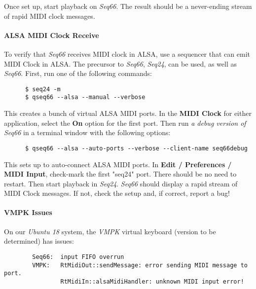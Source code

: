    Once set up, start playback on \textsl{Seq66}.
   The result should be a never-ending stream of rapid MIDI clock messages.

\paragraph{ALSA MIDI Clock Receive}
\label{paragraph:alsa_testing_midi_clock_receive}

   To verify that \textsl{Seq66} receives MIDI clock in ALSA, use a sequencer
   that can emit MIDI Clock in ALSA.  The precursor to \textsl{Seq66},
   \textsl{Seq24}, can be used, as well as \textsl{Seq66}.
   First, run one of the following commands:

   \begin{verbatim}
      $ seq24 -m
      $ qseq66 --alsa --manual --verbose
   \end{verbatim}

   This creates a bunch of virtual ALSA MIDI ports.
   In the \textbf{MIDI Clock} for either application,
   select the \textbf{On} option for the first port.
   Then run \textsl{a debug version of Seq66} in a terminal window
   with the following options:

   \begin{verbatim}
      $ qseq66 --alsa --auto-ports --verbose --client-name seq66debug
   \end{verbatim}

   This sets up to auto-connect ALSA MIDI ports.  In
   \textbf{Edit / Preferences / MIDI Input}, check-mark the first
   "seq24" port.  There should be no need to restart.
   Then start playback in \textsl{Seq24}.
   \textsl{Seq66} should display a rapid stream of MIDI Clock messages.
   If not, check the setup and, if correct, report a bug!

\paragraph{VMPK Issues}
\label{paragraph:alsa_testing_vmpk_issues}

   On our \textsl{Ubuntu 18} system, the \textsl{VMPK} virtual keyboard
   (version to be determined) has issues:

   \begin{verbatim}
        Seq66:  input FIFO overrun
        VMPK:   RtMidiOut::sendMessage: error sending MIDI message to port.
                RtMidiIn::alsaMidiHandler: unknown MIDI input error!
   \end{verbatim}

